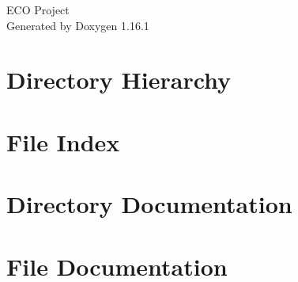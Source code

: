 \documentclass[twoside]{book}
\newcommand{\+}{\discretionary{\mbox{\scriptsize$\hookleftarrow$}}{}{}}
\newcommand{\clearemptydoublepage}{%
    \newpage{\pagestyle{empty}\cleardoublepage}%
  }
\begin{document}
  \raggedbottom
    \hypersetup{pageanchor=false,
                bookmarksnumbered=true,
                pdfencoding=unicode
               }
  \begin{titlepage}
  \vspace*{7cm}
  \begin{center}%
  {\Large ECO Project}\\
  \vspace*{1cm}
  {\large Generated by Doxygen 1.16.1}\\
  \end{center}
  \end{titlepage}
  \clearemptydoublepage
  \tableofcontents
  \clearemptydoublepage
  \hypersetup{pageanchor=true}
\chapter{Directory Hierarchy}

\chapter{File Index}

\chapter{Directory Documentation}




\chapter{File Documentation}
































  \backmatter
  \newpage
  \clearemptydoublepage
  \printindex
\end{document}
